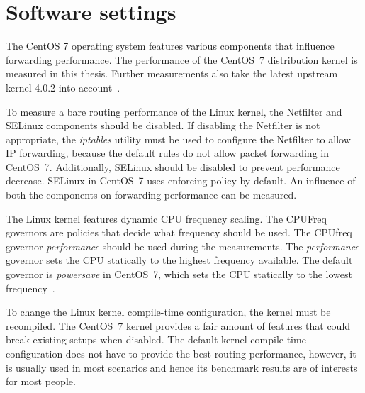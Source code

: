 
\section{Software settings}\label{sec:analysis-settings}
The CentOS 7 operating system features various components that influence forwarding performance.
The performance of the CentOS~7 distribution kernel is measured in this thesis.
Further measurements also take the latest upstream kernel 4.0.2 into account~\cite{kernel-source}.

To measure a bare routing performance of the Linux kernel,
the Netfilter and SELinux components should be disabled.
If disabling the Netfilter is not appropriate,
the {\it{iptables}} utility must be used to configure the Netfilter to allow IP forwarding,
because the default rules do not allow packet forwarding in CentOS~7.
Additionally, SELinux should be disabled to prevent performance decrease.
SELinux in CentOS~7 uses enforcing policy by default.
An influence of both the components on forwarding performance can be measured.

The Linux kernel features dynamic CPU frequency scaling.
The CPUFreq governors are policies that decide what frequency should be used.
The CPUfreq governor {\it{performance}} should be used during the measurements.
The {\it{performance}} governor sets the CPU statically to the
highest frequency available. %
The default governor is {\it{powersave}} in CentOS~7,
which sets the CPU statically to the lowest frequency~\cite{cpufreq-governors}.

To change the Linux kernel compile-time configuration, the kernel must be recompiled.
The CentOS~7 kernel provides a fair amount of features that could break existing setups when disabled.
The default kernel compile-time configuration does not have to provide the best routing performance,
however, it is usually used in most scenarios and hence its benchmark results are of interests for most people.









